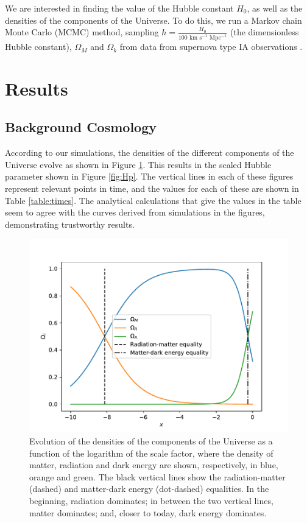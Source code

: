 \documentclass{aa}
\begin{document}
We are interested in finding the value of the Hubble constant $H_0$, as well as the densities of the components of the Universe. To do this, we run a Markov chain Monte Carlo (MCMC) method, sampling $h = \frac{H_0}{100\text{ km s}^{-1}\text{ Mpc}^{-1}}$ (the dimensionless Hubble constant), $\Omega_M$ and $\Omega_k$ from data from supernova type IA observations \citep{Betoule_2014}.

\section{Results}

\subsection{Background Cosmology}

According to our simulations, the densities of the different components of the Universe evolve as shown in Figure \ref{fig:Omegas}. This results in the scaled Hubble parameter shown in Figure \ref{fig:Hp}. The vertical lines in each of these figures represent relevant points in time, and the values for each of these are shown in Table \ref{table:times}. The analytical calculations that give the values in the table seem to agree with the curves derived from simulations in the figures, demonstrating trustworthy results.

\begin{figure}[ht]
\centering
\includegraphics[width=\hsize]{figures/Omegas.pdf}
  \caption{Evolution of the densities of the components of the Universe as a function of the logarithm of the scale factor, where the density of matter, radiation and dark energy are shown, respectively, in blue, orange and green. The black vertical lines show the radiation-matter (dashed) and matter-dark energy (dot-dashed) equalities. In the beginning, radiation dominates; in between the two vertical lines, matter dominates; and, closer to today, dark energy dominates.}
     \label{fig:Omegas}
\end{figure}
\end{document}
